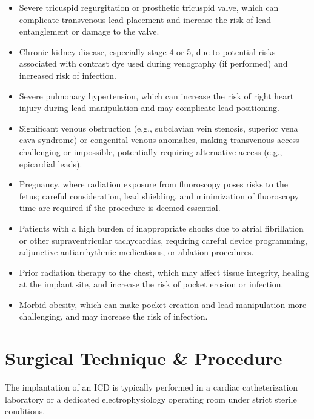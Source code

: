 \begin{itemize}
  \item Severe tricuspid regurgitation or prosthetic tricuspid valve, which can complicate transvenous lead placement and increase the risk of lead entanglement or damage to the valve.
  
  \item Chronic kidney disease, especially stage 4 or 5, due to potential risks associated with contrast dye used during venography (if performed) and increased risk of infection.
  
  \item Severe pulmonary hypertension, which can increase the risk of right heart injury during lead manipulation and may complicate lead positioning.
  
  \item Significant venous obstruction (e.g., subclavian vein stenosis, superior vena cava syndrome) or congenital venous anomalies, making transvenous access challenging or impossible, potentially requiring alternative access (e.g., epicardial leads).
  
  \item Pregnancy, where radiation exposure from fluoroscopy poses risks to the fetus; careful consideration, lead shielding, and minimization of fluoroscopy time are required if the procedure is deemed essential.
  
  \item Patients with a high burden of inappropriate shocks due to atrial fibrillation or other supraventricular tachycardias, requiring careful device programming, adjunctive antiarrhythmic medications, or ablation procedures.
  
  \item Prior radiation therapy to the chest, which may affect tissue integrity, healing at the implant site, and increase the risk of pocket erosion or infection.
  
  \item Morbid obesity, which can make pocket creation and lead manipulation more challenging, and may increase the risk of infection.
\end{itemize}

\section*{Surgical Technique \& Procedure}
The implantation of an ICD is typically performed in a cardiac catheterization laboratory or a dedicated electrophysiology operating room under strict sterile conditions.

